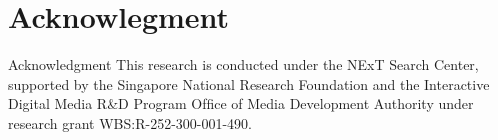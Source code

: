 \documentclass{sig-alternate}
\begin{document}
\section*{Acknowlegment}
Acknowledgment This research is conducted under the NExT Search Center, supported by the Singapore National Research Foundation and the Interactive \cite{carter2007ceramic} Digital Media R\&D Program Ofﬁce of Media Development Authority under research grant WBS:R-252-300-001-490.



\end{document}
